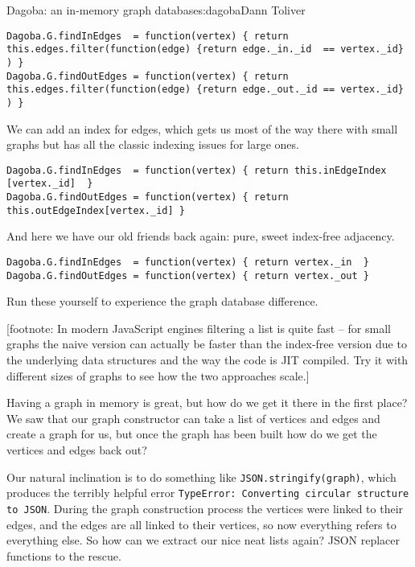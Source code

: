 \begin{aosachapter}{Dagoba: an in-memory graph database}{s:dagoba}{Dann Toliver}
\begin{verbatim}
Dagoba.G.findInEdges  = function(vertex) { return this.edges.filter(function(edge) {return edge._in._id  == vertex._id} ) }
Dagoba.G.findOutEdges = function(vertex) { return this.edges.filter(function(edge) {return edge._out._id == vertex._id} ) }
\end{verbatim}

We can add an index for edges, which gets us most of the way there with
small graphs but has all the classic indexing issues for large ones.

\begin{verbatim}
Dagoba.G.findInEdges  = function(vertex) { return this.inEdgeIndex [vertex._id]  }
Dagoba.G.findOutEdges = function(vertex) { return this.outEdgeIndex[vertex._id] }
\end{verbatim}

And here we have our old friends back again: pure, sweet index-free
adjacency.

\begin{verbatim}
Dagoba.G.findInEdges  = function(vertex) { return vertex._in  }
Dagoba.G.findOutEdges = function(vertex) { return vertex._out }
\end{verbatim}

Run these yourself to experience the graph database difference.

{[}footnote: In modern JavaScript engines filtering a list is quite fast
-- for small graphs the naive version can actually be faster than the
index-free version due to the underlying data structures and the way the
code is JIT compiled. Try it with different sizes of graphs to see how
the two approaches scale.{]}

\label{serialization}

Having a graph in memory is great, but how do we get it there in the
first place? We saw that our graph constructor can take a list of
vertices and edges and create a graph for us, but once the graph has
been built how do we get the vertices and edges back out?

Our natural inclination is to do something like
\texttt{JSON.stringify(graph)}, which produces the terribly helpful
error \texttt{TypeError: Converting circular structure to JSON}. During
the graph construction process the vertices were linked to their edges,
and the edges are all linked to their vertices, so now everything refers
to everything else. So how can we extract our nice neat lists again?
JSON replacer functions to the rescue.


\end{aosachapter}
